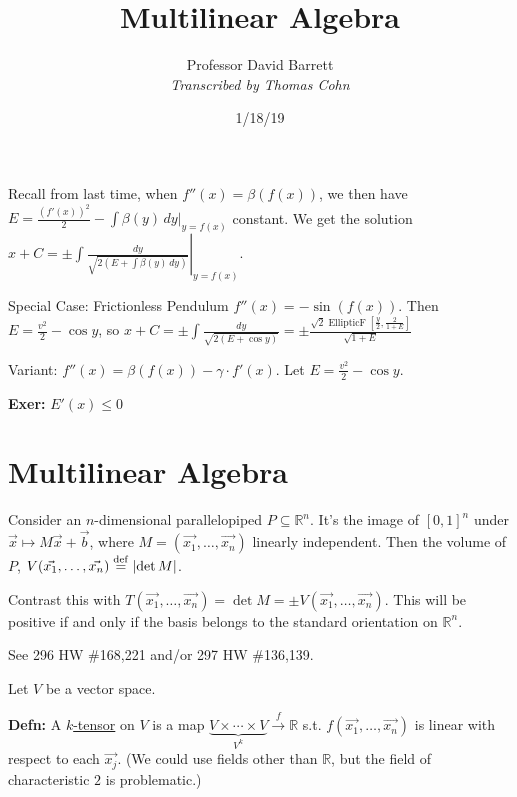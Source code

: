 \documentclass[10pt,letterpaper]{article}
\author{Professor David Barrett\\ \small\textit{Transcribed by Thomas Cohn}}
\title{Multilinear Algebra}
\date{1/18/19} %
\newcommand{\n}{\hfill\break}
\newcommand{\defn}[1]{\par\noindent\settowidth{\hangindent}{\textbf{Defn: }}\textbf{Defn: }#1\n}
\newcommand{\exer}[1]{\par\noindent\settowidth{\hangindent}{\textbf{Exer: }}\textbf{Exer: }#1\n}
\newcommand{\ptxt}[1]{\textrm{\textnormal{#1}}}
\newcommand{\reals}{\mathbb{R}}
\newcommand{\R}{\reals}
\newcommand{\abs}[1]{\left|#1\right|}
\newcommand{\st}{s.t.}
\newcommand{\eqdef}{\overset{\ptxt{def}}{=}}
\renewcommand{\brack}[1]{\left[#1\right]}
\begin{document}
\maketitle
\setlength\RaggedRightParindent{\parindent}
\RaggedRight

\par\noindent Recall from last time, when $f''(x)=\beta(f(x))$, we then have $E=\frac{(f'(x))^{2}}{2}-\int\beta(y)\,dy|_{y=f(x)}$ constant.\n
We get the solution $\displaystyle{}x+C=\left.\pm\int\frac{dy}{\sqrt{2(E+\int\beta(y)\,dy)}}\right|_{y=f(x)}$.\n

\par\noindent Special Case: Frictionless Pendulum\n
$f''(x)=-\sin(f(x))$.\n
Then $E=\frac{v^{2}}{2}-\cos{}y$, so\n
$\displaystyle{}x+C=\pm\int\frac{dy}{\sqrt{2(E+\cos{}y)}}=\pm\frac{\sqrt{2}\operatorname{EllipticF}\brack{\frac{y}{2},\frac{2}{1+E}}}{\sqrt{1+E}}$\n

\par\noindent Variant: $f''(x)=\beta(f(x))-\gamma\cdot{}f'(x)$. Let $E=\frac{v^{2}}{2}-\cos{}y$.\n

\exer{$E'(x)\le{}0$}

\newpage
\section*{Multilinear Algebra}

\par\noindent Consider an $n$-dimensional parallelopiped $P\subseteq\R^{n}$. It's the image of $[0,1]^{n}$ under $\vec{x}\mapsto{}M\vec{x}+\vec{b}$, where $M=(\vec{x_{1}},\ldots,\vec{x_{n}})$ linearly independent. Then the volume of $P$, $V(\vec{x_{1}},\ldots,\vec{x_{n}})\eqdef\abs{\det{M}}$.\n

\par\noindent Contrast this with $T(\vec{x_{1}},\ldots,\vec{x_{n}})=\det{}M=\pm{}V(\vec{x_{1}},\ldots,\vec{x_{n}})$. This will be positive if and only if the basis belongs to the standard orientation on $\R^{n}$.\n

\par\noindent See 296 HW \#168,221 and/or 297 HW \#136,139.\n

\par\noindent Let $V$ be a vector space.\n

\defn{A \underline{$k$-tensor} on $V$ is a map $\underbrace{V\times\cdots\times{}V}_{V^{k}}\overset{f}{\to}\R$ \st{} $f(\vec{x_{1}},\ldots,\vec{x_{n}})$ is linear with respect to each $\vec{x_{j}}$.\n
(We could use fields other than $\R$, but the field of characteristic $2$ is problematic.)}
\end{document}
